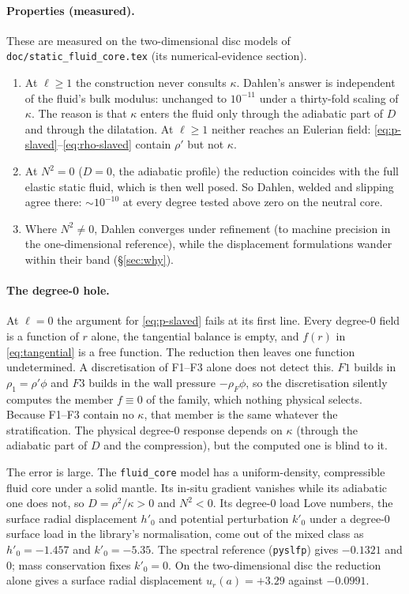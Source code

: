 \documentclass[11pt]{article}
\theoremstyle{definition}
\theoremstyle{remark}
\newcommand{\code}[1]{\texttt{#1}}
\begin{document}
\paragraph{Properties (measured).} These are measured on the
two-dimensional disc models of \code{doc/static\_fluid\_core.tex} (its
numerical-evidence section).
\begin{enumerate}
\item[(i)] At $\ell \ge 1$ the construction never consults $\kappa$.
  Dahlen's answer is independent of the fluid's bulk modulus:
  unchanged to $10^{-11}$ under a thirty-fold scaling of $\kappa$. The
  reason is that $\kappa$ enters the fluid only through the adiabatic
  part of $D$ and through the dilatation. At $\ell \ge 1$ neither
  reaches an Eulerian field: \eqref{eq:p-slaved}--\eqref{eq:rho-slaved}
  contain $\rho'$ but not $\kappa$.
\item[(ii)] At $N^2 = 0$ ($D = 0$, the adiabatic profile) the reduction
  coincides with the full elastic static fluid, which is then well
  posed. So Dahlen, welded and slipping agree there: $\sim 10^{-10}$ at
  every degree tested above zero on the neutral core.
\item[(iii)] Where $N^2 \ne 0$, Dahlen converges under refinement (to
  machine precision in the one-dimensional reference), while the
  displacement formulations wander within their band
  (\S\ref{sec:why}).
\end{enumerate}

\paragraph{The degree-0 hole.} At $\ell = 0$ the argument for
\eqref{eq:p-slaved} fails at its first line. Every degree-0 field is a
function of $r$ alone, the tangential balance is empty, and $f(r)$ in
\eqref{eq:tangential} is a free function. The reduction then leaves one
function undetermined. A discretisation of F1--F3 alone does not detect
this. $F1$ builds in $\rho_1 = \rho'\phi$ and $F3$ builds in the wall
pressure $-\rho_F\phi$, so the discretisation silently computes the
member $f \equiv 0$ of the family, which nothing physical selects.
Because F1--F3 contain no $\kappa$, that member is the same whatever
the stratification. The physical degree-0 response depends on $\kappa$
(through the adiabatic part of $D$ and the compression), but the
computed one is blind to it.

The error is large. The \code{fluid\_core} model has a uniform-density,
compressible fluid core under a solid mantle. Its in-situ gradient
vanishes while its adiabatic one does not, so $D = \rho^2/\kappa > 0$
and $N^2 < 0$. Its degree-0 load Love numbers, the surface radial
displacement $h'_0$ and potential perturbation $k'_0$ under a degree-0
surface load in the library's normalisation, come out of the mixed
class as $h'_0 = -1.457$ and $k'_0 = -5.35$. The spectral reference
(\code{pyslfp}) gives $-0.1321$ and $0$; mass conservation fixes $k'_0
= 0$. On the two-dimensional disc the reduction alone gives a surface
radial displacement $u_r(a) = +3.29$ against $-0.0991$.
\end{document}
